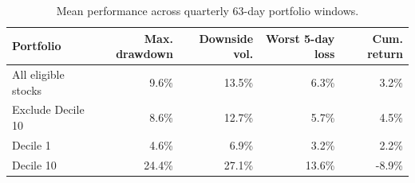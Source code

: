 \begin{table}[!htbp]
\centering
\footnotesize
\caption{Mean performance across quarterly 63-day portfolio windows.}
\label{tab:portfolio-event-windows}
\begin{tabular}{lrrrr}
\toprule
Portfolio & Max. drawdown & Downside vol. & Worst 5-day loss & Cum. return \\
\midrule
All eligible stocks & 9.6\% & 13.5\% & 6.3\% & 3.2\% \\
Exclude Decile 10 & 8.6\% & 12.7\% & 5.7\% & 4.5\% \\
Decile 1 & 4.6\% & 6.9\% & 3.2\% & 2.2\% \\
Decile 10 & 24.4\% & 27.1\% & 13.6\% & -8.9\% \\
\bottomrule
\end{tabular}
\end{table}

